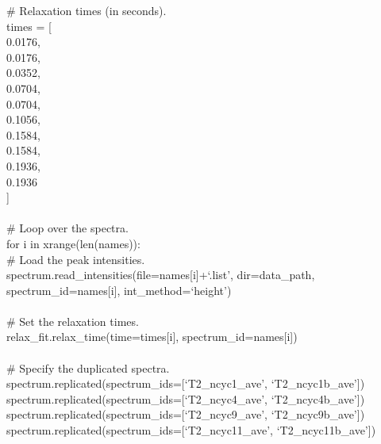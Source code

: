 \begin{exampleenv}
\# Relaxation times (in seconds). \\
times = [ \\
\hspace*{4ex} 0.0176, \\
\hspace*{4ex} 0.0176, \\
\hspace*{4ex} 0.0352, \\
\hspace*{4ex} 0.0704, \\
\hspace*{4ex} 0.0704, \\
\hspace*{4ex} 0.1056, \\
\hspace*{4ex} 0.1584, \\
\hspace*{4ex} 0.1584, \\
\hspace*{4ex} 0.1936, \\
\hspace*{4ex} 0.1936 \\
] \\
 \\
\# Loop over the spectra. \\
for i in xrange(len(names)): \\
\hspace*{4ex} \# Load the peak intensities. \\
\hspace*{4ex} spectrum.read\_intensities(file=names[i]+`.list', dir=data\_path, spectrum\_id=names[i], int\_method=`height') \\
 \\
\hspace*{4ex} \# Set the relaxation times. \\
\hspace*{4ex} relax\_fit.relax\_time(time=times[i], spectrum\_id=names[i]) \\
 \\
\# Specify the duplicated spectra. \\
spectrum.replicated(spectrum\_ids=[`T2\_ncyc1\_ave', `T2\_ncyc1b\_ave']) \\
spectrum.replicated(spectrum\_ids=[`T2\_ncyc4\_ave', `T2\_ncyc4b\_ave']) \\
spectrum.replicated(spectrum\_ids=[`T2\_ncyc9\_ave', `T2\_ncyc9b\_ave']) \\
spectrum.replicated(spectrum\_ids=[`T2\_ncyc11\_ave', `T2\_ncyc11b\_ave']) \\

\end{exampleenv}
